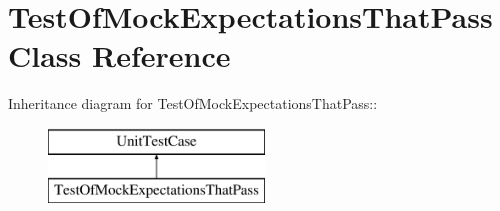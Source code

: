\hypertarget{class_test_of_mock_expectations_that_pass}{
\section{TestOfMockExpectationsThatPass Class Reference}
\label{class_test_of_mock_expectations_that_pass}
}
Inheritance diagram for TestOfMockExpectationsThatPass::\begin{figure}[H]
\begin{center}
\leavevmode
\includegraphics[height=2cm]{class_test_of_mock_expectations_that_pass}
\end{center}
\end{figure}
